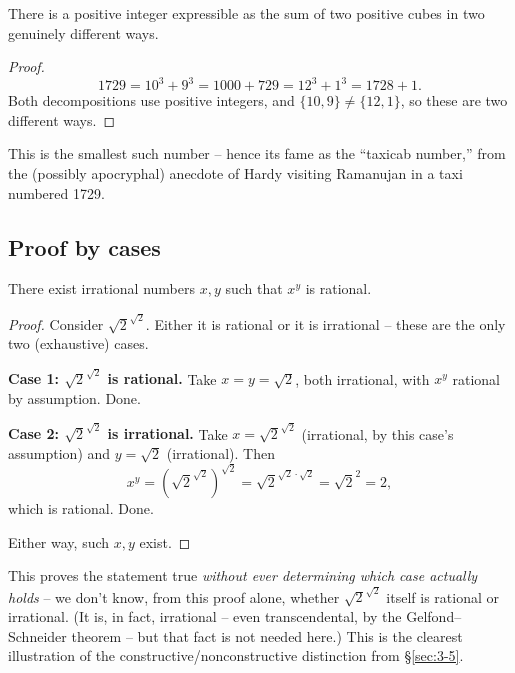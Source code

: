 \begin{example}
There is a positive integer expressible as the sum of two positive cubes in two genuinely different ways.
\end{example}
\begin{proof}
\[
1729 = 10^3 + 9^3 = 1000 + 729 = 12^3 + 1^3 = 1728 + 1.
\]
Both decompositions use positive integers, and $\{10,9\} \neq \{12,1\}$, so these are two different ways.
\end{proof}

\begin{note}
This is the smallest such number -- hence its fame as the ``taxicab number,'' from the (possibly apocryphal) anecdote of Hardy visiting Ramanujan in a taxi numbered 1729.
\end{note}

\subsection{Proof by cases}
\label{sec:3-8}

\begin{example}
There exist irrational numbers $x, y$ such that $x^y$ is rational.
\end{example}
\begin{proof}
Consider $\sqrt{2}^{\sqrt{2}}$. Either it is rational or it is irrational -- these are the only two (exhaustive) cases.

\textbf{Case 1: $\sqrt{2}^{\sqrt{2}}$ is rational.} Take $x = y = \sqrt{2}$, both irrational, with $x^y$ rational by assumption. Done.

\textbf{Case 2: $\sqrt{2}^{\sqrt{2}}$ is irrational.} Take $x = \sqrt{2}^{\sqrt{2}}$ (irrational, by this case's assumption) and $y = \sqrt{2}$ (irrational). Then
\[
x^y = \left(\sqrt{2}^{\sqrt{2}}\right)^{\sqrt{2}} = \sqrt{2}^{\sqrt{2}\cdot\sqrt{2}} = \sqrt{2}^2 = 2,
\]
which is rational. Done.

Either way, such $x,y$ exist.
\end{proof}

\begin{note}
This proves the statement true \emph{without ever determining which case actually holds} -- we don't know, from this proof alone, whether $\sqrt2^{\sqrt2}$ itself is rational or irrational. (It is, in fact, irrational -- even transcendental, by the Gelfond--Schneider theorem -- but that fact is not needed here.) This is the clearest illustration of the constructive/nonconstructive distinction from \S\ref{sec:3-5}.
\end{note}

